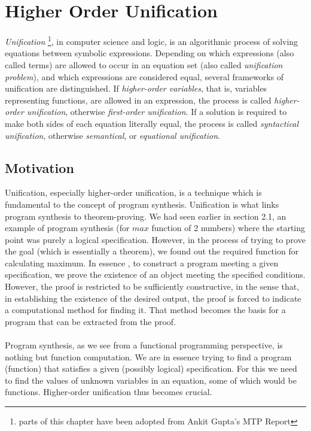 \chapter{Higher Order Unification}

\emph{Unification} \footnote{parts of this chapter have been adopted from Ankit Gupta's MTP Report}, in computer science and logic, is an algorithmic process of solving equations between symbolic expressions. Depending on which expressions (also called terms) are allowed to occur in an equation set (also called \emph{unification problem}), and which expressions are considered equal, several frameworks of unification are distinguished. If \emph{higher-order variables}, that is, variables representing functions, are allowed in an expression, the process is called \emph{higher-order unification}, otherwise \emph{first-order unification}. If a solution is required to make both sides of each equation literally equal, the process is called \emph{syntactical unification}, otherwise \emph{semantical}, or \emph{equational unification}.

\section{Motivation}
Unification, especially higher-order unification, is a technique which is fundamental to the concept of program synthesis. Unification is what links program synthesis to theorem-proving. We had seen earlier in section 2.1, an example of program synthesis (for $max$ function of 2 numbers) where the starting point was purely a logical specification. However, in the process of trying to prove the goal (which is essentially a theorem), we found out the required function for calculating maximum. In essence \cite{Manna92fundamentalsof}, to construct a program meeting a given specification, we prove the existence of an object meeting the specified conditions. However, the proof is restricted to be sufficiently constructive, in the sense that, in establishing the existence of the desired output, the proof is forced to indicate a computational method for finding it. That method becomes the basis for a program that can be extracted from the proof. \\\\
Program synthesis, as we see from a functional programming perspective, is nothing but function computation. We are in essence trying to find a program (function) that satisfies a given (possibly logical) specification. 
For this we need to find the values of unknown variables in an equation, some of which would be functions. Higher-order unification thus becomes crucial.


